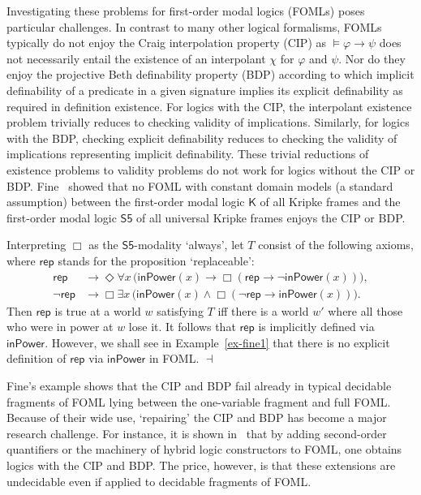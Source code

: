 \documentclass{lmcs} %
\theoremstyle{plain}\newtheorem{satz}[thm]{Satz} %
\begin{document}
%
Investigating these problems for first-order modal logics (FOMLs) poses particular challenges. In contrast to many other logical formalisms, FOMLs typically do not enjoy the Craig interpolation property (CIP) as $\models \varphi \rightarrow \psi$ does not necessarily entail the existence of an interpolant $\chi$ for $\varphi$ and $\psi$. Nor do they enjoy the projective Beth definability property (BDP) according to which implicit definability of a predicate in a given signature  implies its explicit definability as required in definition existence. For logics with the CIP, 
the interpolant existence problem trivially reduces to checking validity of implications. Similarly, for logics with the BDP, checking explicit definability reduces to checking the validity of implications representing implicit definability. These trivial reductions of existence problems to validity problems do not work for logics without the CIP or BDP. 
Fine~\cite{DBLP:journals/jsyml/Fine79} showed that no FOML with constant domain models (a standard assumption) between the first-order modal logic $\mathsf{K}$ of all Kripke frames and the first-order modal logic $\mathsf{S5}$ of all universal Kripke frames enjoys the CIP or BDP.

\begin{exa}\label{Ex:Fine}
Interpreting $\Box$ as the $\mathsf{S5}$-modality `always'\!, let $T$ consist of the following axioms, where $\mathsf{rep}$ stands for the proposition `replaceable':
%
\begin{align*}
\mathsf{rep} &\rightarrow \Diamond \forall x\, \big(\mathsf{inPower}(x) \rightarrow \Box (\mathsf{rep} \rightarrow \neg \mathsf{inPower}(x)) \big),\\
\neg \mathsf{rep} &\rightarrow \Box \exists x\, \big( \mathsf{inPower}(x) \wedge \Box (\neg \mathsf{rep} \rightarrow \mathsf{inPower}(x)) \big).
\end{align*}
%
Then $\mathsf{rep}$ is true at a world $w$ satisfying $T$ iff there is a world $w'$ where all those who were in power at $w$ lose it. It follows that $\mathsf{rep}$ is implicitly defined via $\mathsf{inPower}$. However, we shall see in Example~\ref{ex-fine1} that there is no explicit definition of $\mathsf{rep}$ 
via $\mathsf{inPower}$ in FOML.  \hfill $\dashv$
\end{exa}

Fine's example shows that the CIP and BDP fail already in typical decidable fragments of FOML lying between the one-variable fragment and full FOML.  Because of their wide use, `repairing' the CIP and BDP has become a major research challenge. For instance, it is shown in~\cite{DBLP:journals/jsyml/Fitting02,DBLP:journals/apal/ArecesBM03} that by adding second-order quantifiers or the machinery of hybrid logic constructors to FOML, one obtains logics with the CIP and BDP. The price, however, is that these extensions are undecidable even if applied to decidable fragments of FOML.  
\end{document}
